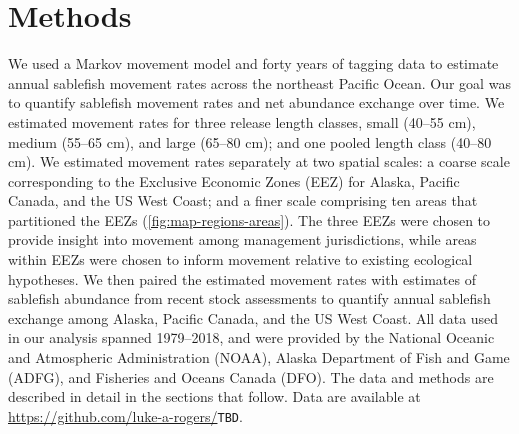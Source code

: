 \documentclass{article}
\newcommand{\lr}[1]{{\color{blue}#1}}
\begin{document}
\section{Methods}

We used a Markov movement model and forty years of tagging data to estimate annual sablefish movement rates across the northeast Pacific Ocean. Our goal was to quantify sablefish movement rates and net abundance exchange over time. We estimated movement rates for three release length classes, small (40--55 cm), medium (55--65 cm), and large (65--80 cm); and one pooled length class (40--80 cm). We estimated movement rates separately at two spatial scales: a coarse scale corresponding to the Exclusive Economic Zones (EEZ) for Alaska, Pacific Canada, and the US West Coast; and a finer scale comprising ten areas that partitioned the EEZs (\autoref{fig:map-regions-areas}). The three EEZs were chosen to provide insight into movement among management jurisdictions, while areas within EEZs were chosen to inform movement relative to existing ecological hypotheses. We then paired the estimated movement rates with estimates of sablefish abundance from recent stock assessments to quantify annual sablefish exchange among Alaska, Pacific Canada, and the US West Coast. All data used in our analysis spanned 1979--2018, and were provided by the National Oceanic and Atmospheric Administration (NOAA), Alaska Department of Fish and Game (ADFG), and Fisheries and Oceans Canada (DFO). The data and methods are described in detail in the sections that follow. Data are available at \url{https://github.com/luke-a-rogers/}\lr{\texttt{TBD}}.
\end{document}
